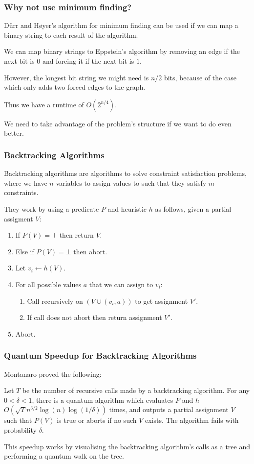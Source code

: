 \documentclass[]{beamer}
\begin{document}
\begin{frame}
\frametitle{Why not use minimum finding?}
D\"urr and H\o yer's algorithm for minimum finding can be used if we can map a binary string to each result of the algorithm.

We can map binary strings to Eppstein's algorithm by removing an edge if the next bit is $0$ and forcing it if the next bit is $1$.

However, the longest bit string we might need is $n/2$ bits, because of the case which only adds two forced edges to the graph.

Thus we have a runtime of $O(2^{n/4})$.

We need to take advantage of the problem's structure if we want to do even better.
\end{frame}

\begin{frame}
\frametitle{Backtracking Algorithms}
Backtracking algorithms are algorithms to solve constraint satisfaction problems, where we have $n$ variables to assign values to such that they satisfy $m$ constraints.

They work by using a predicate $P$ and heuristic $h$ as follows, given a partial assigment $V$:

\begin{enumerate}
\item If $P(V) = \top$ then return $V$.
\item Else if $P(V) = \bot$ then abort.
\item Let $v_{i} \leftarrow h(V)$.
\item For all possible values $a$ that we can assign to $v_{i}$:
\begin{enumerate}
\item Call recursively on $(V \cup (v_{i}, a))$ to get assignment $V'$.
\item If call does not abort then return assignment $V'$.
\end{enumerate}
\item Abort.
\end{enumerate}
\end{frame}

\begin{frame}
\frametitle{Quantum Speedup for Backtracking Algorithms}

Montanaro proved the following:

\begin{theorem}[Montanaro]
Let $T$ be the number of recursive calls made by a backtracking algorithm. For any $0 < \delta < 1$, there is a quantum algorithm which evaluates $P$ and $h$ $O(\sqrt{T}n^{3/2}\log(n)\log(1/\delta))$ times, and outputs a partial assignment $V$ such that $P(V)$ is true or aborts if no such $V$ exists. The algorithm fails with probability $\delta$.
\end{theorem}

This speedup works by visualising the backtracking algorithm's calls as a tree and performing a quantum walk on the tree.
\end{frame}
\end{document}
